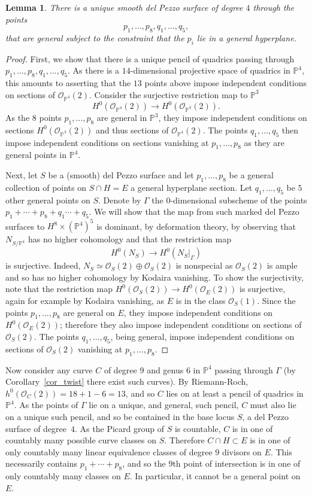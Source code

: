\documentclass[11pt]{amsart}
\newcommand{\pp}{\mathbb{P}}
\renewcommand{\O}{\mathcal{O}}
\newtheorem{lem}[thm]{Lemma}
\theoremstyle{definition}
\theoremstyle{remark}
\begin{document}
\begin{lem}\label{sm_dP_2}
There is a unique smooth del Pezzo surface of degree $4$ through the points
\[p_1, \ldots, p_8, q_1, \ldots, q_5, \]
that are general subject to the constraint that the $p_i$ lie in a general hyperplane.
\end{lem}
\begin{proof}
First, we show that there is a unique pencil of quadrics passing through $p_1, \ldots, p_8, q_1, \ldots, q_5$.  As there is a $14$-dimensional projective space of quadrics in $\pp^4$, this amounts to asserting that the $13$ points above impose independent conditions on sections of $\O_{\pp^4}(2)$.  Consider the surjective restriction map to $\pp^3$
\[H^0(\O_{\pp^4}(2)) \to H^0(\O_{\pp^3}(2)). \]
As the $8$ points $p_1, \ldots, p_8$ are general in $\pp^3$, they impose independent conditions on sections $H^0(\O_{\pp^3}(2))$ and thus sections of $\O_{\pp^4}(2)$.  The points $q_1, \ldots, q_5$ then impose independent conditions on sections vanishing at $p_1, \ldots, p_8$ as they are general points in $\pp^4$.  

Next, let $S$ be a (smooth) del Pezzo surface and let $p_1, \ldots, p_8$ be a general collection of points on $S \cap H =E$ a general hyperplane section.  Let $q_1, \ldots, q_5$ be $5$ other general points on $S$.  Denote by $\Gamma$ the $0$-dimensional subscheme of the points $p_1 + \cdots + p_8 + q_1 \cdots + q_5$.  We will show that the map from such marked del Pezzo surfaces to $H^8 \times ({\pp^4})^5$ is dominant, by deformation theory, by observing that $N_{S / \pp^4}$ has no higher cohomology and
that the restriction map
\[H^0(N_S) \to H^0(N_S|_\Gamma)\]
is surjective.
Indeed, $N_S \simeq \O_S(2) \oplus \O_S(2)$ is nonspecial as $\O_S(2)$ is ample and so has no higher cohomology by Kodaira vanishing.
To show the surjectivity, note that
the restriction map $H^0(\O_S(2)) \to H^0(\O_E(2))$ is surjective, again for example by Kodaira vanishing, as $E$ is in the class $\O_S(1)$.  Since the points $p_1, \ldots, p_{8}$ are general on $E$, they impose independent conditions on $H^0(\O_E(2))$; therefore they also impose independent conditions on sections of $\O_S(2)$.
The points $q_1, \ldots, q_5$, being general, impose independent conditions on sections of $\O_S(2)$
vanishing at $p_1, \ldots, p_{8}$.
\end{proof}

Now consider any curve $C$ of degree $9$ and genus $6$ in $\pp^4$ passing through $\Gamma$ (by Corollary~\ref{cor_twist} there exist such curves).  By Riemann-Roch, $h^0(\O_C(2)) = 18+1-6 = 13$, and so $C$ lies on at least a pencil of quadrics in $\pp^4$.  As the points of $\Gamma$ lie on a unique, and general, such pencil, $C$ must also lie on a unique such pencil, and so be contained in the base locus $S$, a del Pezzo surface of degree~$4$.  As the Picard group of $S$ is countable, $C$ is in one of countably many possible curve classes on $S$.  Therefore $C \cap H \subset E$ is in one of only countably many linear equivalence classes of degree $9$ divisors on $E$.  This necessarily contains $p_1 + \cdots + p_8$, and so the $9$th point of intersection is in one of only countably many classes on $E$.  In particular, it cannot be a general point on $E$.
\end{document}
